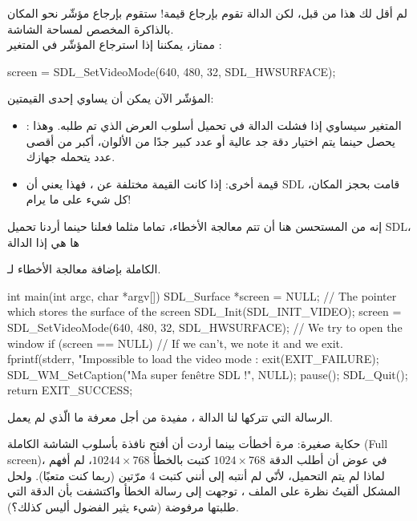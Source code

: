 لم أقل لك هذا من قبل، لكن الدالة
تقوم بإرجاع قيمة! ستقوم بإرجاع مؤشّر نحو المكان بالذاكرة المخصص لمساحة الشاشة.\\
ممتاز، يمكننا إذا استرجاع المؤشّر في المتغير 
:

\begin{Csource}
screen = SDL_SetVideoMode(640, 480, 32, SDL_HWSURFACE);
\end{Csource}

المؤشّر الآن يمكن أن يساوي إحدى القيمتين:

\begin{itemize}
	\item {}:
	المتغير 
	سيساوي
	إذا فشلت الدالة
	في تحميل أسلوب العرض الذي تم طلبه. وهذا يحصل حينما يتم اختيار دقة جد عالية أو عدد كبير جدًا من الألوان، أكبر من أقصى عدد يتحمله جهازك.
	\item قيمة أخرى: إذا كانت القيمة مختلفة عن 
	،
	فهذا يعني أن \textenglish{SDL}
	قامت بحجز المكان، كل شيء على ما يرام!
\end{itemize}

إنه من المستحسن هنا أن تتم معالجة الأخطاء، تماما مثلما فعلنا حينما أردنا تحميل \textenglish{SDL}،
ها هي إذا الدالة

الكاملة بإضافة معالجة الأخطاء لـ.

\begin{Csource}
int main(int argc, char *argv[])
{
	SDL_Surface *screen = NULL; // The pointer which stores the surface of the screen
	SDL_Init(SDL_INIT_VIDEO);
	screen = SDL_SetVideoMode(640, 480, 32, SDL_HWSURFACE); // We try to open the window
	if (screen  == NULL) // If we can't, we note it and we exit.
	{
		fprintf(stderr, "Impossible to load the video mode : %
		exit(EXIT_FAILURE);
	}
	SDL_WM_SetCaption("Ma super fenêtre SDL !", NULL);
	pause();
	SDL_Quit();
	return EXIT_SUCCESS;
}
\end{Csource}

الرسالة التي تتركها لنا الدالة
،
مفيدة من أجل معرفة ما الّذي لم يعمل.

\begin{information}
حكاية صغيرة: مرة أخطأت بينما أردت أن أفتح نافذة بأسلوب الشاشة الكاملة 
(\textenglish{Full screen})،
في عوض أن أطلب الدقة
$1024 \times 768$
كتبت بالخطأ 
$10244 \times 768$،
لم أفهم لماذا لم يتم التحميل، لأنّي لم أنتبه إلى أنني كتبت 4 مرّتين (ربما كنت متعبًا). ولحل المشكل ألقيتُ نظرة على الملف 
،
توجهت إلى رسالة الخطأ واكتشفت بأن الدقة التي طلبتها مرفوضة (شيء يثير الفضول أليس كذلك؟).
\end{information}

